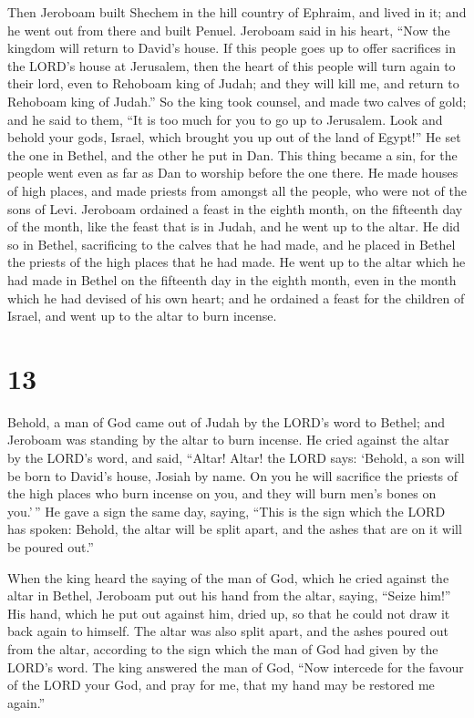  Then Jeroboam built Shechem in the hill country of
Ephraim, and lived in it; and he went out from there and built Penuel.
 Jeroboam said in his heart, ``Now the kingdom will
return to David's house.  If this people goes up to offer
sacrifices in the LORD's house at Jerusalem, then the heart of this
people will turn again to their lord, even to Rehoboam king of Judah;
and they will kill me, and return to Rehoboam king of Judah.''
 So the king took counsel, and made two calves of gold;
and he said to them, ``It is too much for you to go up to Jerusalem.
Look and behold your gods, Israel, which brought you up out of the land
of Egypt!''  He set the one in Bethel, and the other he
put in Dan.  This thing became a sin, for the people went
even as far as Dan to worship before the one there.  He
made houses of high places, and made priests from amongst all the
people, who were not of the sons of Levi.  Jeroboam
ordained a feast in the eighth month, on the fifteenth day of the month,
like the feast that is in Judah, and he went up to the altar. He did so
in Bethel, sacrificing to the calves that he had made, and he placed in
Bethel the priests of the high places that he had made. 
He went up to the altar which he had made in Bethel on the fifteenth day
in the eighth month, even in the month which he had devised of his own
heart; and he ordained a feast for the children of Israel, and went up
to the altar to burn incense.

\hypertarget{section-12}{%
\section{13}\label{section-12}}

 Behold, a man of God came out of Judah by the LORD's word
to Bethel; and Jeroboam was standing by the altar to burn incense.
 He cried against the altar by the LORD's word, and said,
``Altar! Altar! the LORD says: `Behold, a son will be born to David's
house, Josiah by name. On you he will sacrifice the priests of the high
places who burn incense on you, and they will burn men's bones on
you.'\,''  He gave a sign the same day, saying, ``This is
the sign which the LORD has spoken: Behold, the altar will be split
apart, and the ashes that are on it will be poured out.''

 When the king heard the saying of the man of God, which
he cried against the altar in Bethel, Jeroboam put out his hand from the
altar, saying, ``Seize him!'' His hand, which he put out against him,
dried up, so that he could not draw it back again to himself.
 The altar was also split apart, and the ashes poured out
from the altar, according to the sign which the man of God had given by
the LORD's word.  The king answered the man of God, ``Now
intercede for the favour of the LORD your God, and pray for me, that my
hand may be restored me again.''

